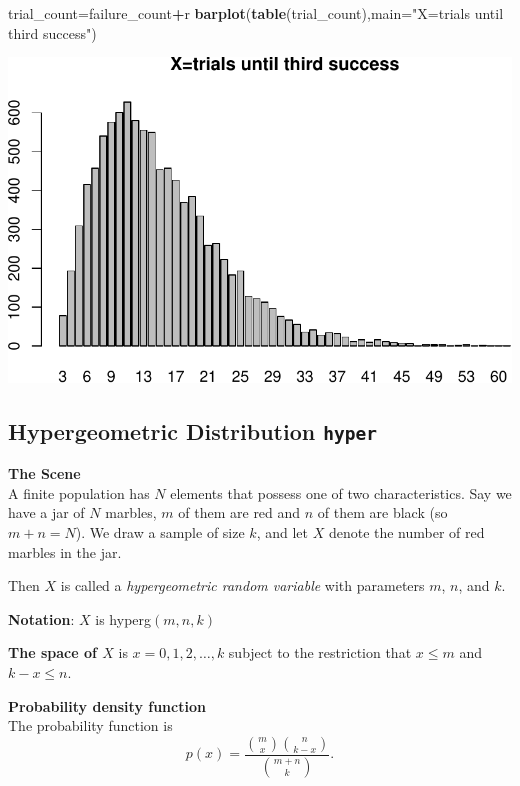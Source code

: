 \documentclass[
]{book}
\newenvironment{Shaded}{\begin{snugshade}}{\end{snugshade}}
\newcommand{\AttributeTok}[1]{\textcolor[rgb]{0.13,0.29,0.53}{#1}}
\newcommand{\FunctionTok}[1]{\textcolor[rgb]{0.13,0.29,0.53}{\textbf{#1}}}
\newcommand{\NormalTok}[1]{#1}
\newcommand{\OtherTok}[1]{\textcolor[rgb]{0.56,0.35,0.01}{#1}}
\newcommand{\SpecialCharTok}[1]{\textcolor[rgb]{0.81,0.36,0.00}{\textbf{#1}}}
\newcommand{\StringTok}[1]{\textcolor[rgb]{0.31,0.60,0.02}{#1}}
\theoremstyle{definition}
\theoremstyle{definition}
\theoremstyle{definition}
\theoremstyle{definition}
\theoremstyle{remark}
\begin{document}
\begin{Shaded}
\begin{Highlighting}[]
\NormalTok{trial\_count}\OtherTok{=}\NormalTok{failure\_count}\SpecialCharTok{+}\NormalTok{r}
\FunctionTok{barplot}\NormalTok{(}\FunctionTok{table}\NormalTok{(trial\_count),}\AttributeTok{main=}\StringTok{"X=trials until third success"}\NormalTok{)}
\end{Highlighting}
\end{Shaded}

\includegraphics{math340-notes_files/figure-latex/unnamed-chunk-159-1.pdf}

\subsection{\texorpdfstring{Hypergeometric Distribution \texttt{hyper}}{Hypergeometric Distribution hyper}}\label{hypergeometric-distribution-hyper}

\textbf{The Scene}\\
A finite population has \(N\) elements that possess one of two characteristics. Say we have a jar of \(N\) marbles, \(m\) of them are red and \(n\) of them are black (so \(m + n = N\)). We draw a sample of size \(k\), and let \(X\) denote the number of red marbles in the jar.

Then \(X\) is called a \emph{hypergeometric random variable} with parameters \(m\), \(n\), and \(k\).

\textbf{Notation}: \(X\) is hyperg\((m,n,k)\)

\textbf{The space of \(X\)} is \(x = 0,1,2,\ldots,k\) subject to the restriction that \(x \leq m\) and \(k - x \leq n\).

\textbf{Probability density function}\\
The probability function is \[p(x)= \frac{\binom{m}{x}\binom{n}{k-x}}{\binom{m+n}{k}}.\]
\end{document}
